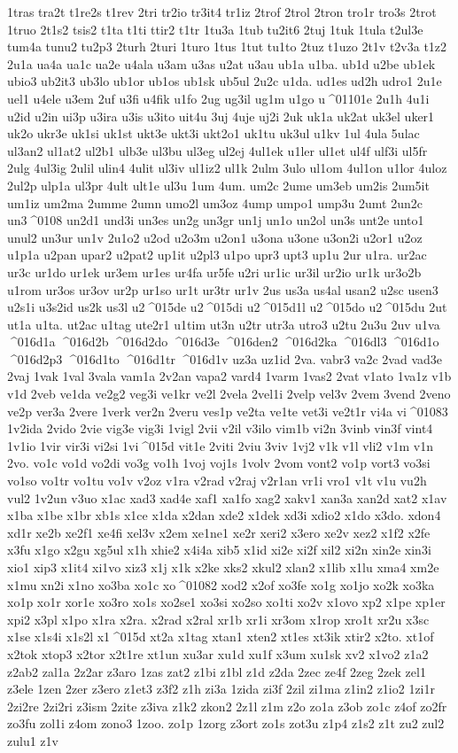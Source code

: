 {1tras
tra2t
t1re2s
t1rev
2tri
tr2io
tr3it4
tr1iz
2trof
2trol
2tron
tro1r
tro3s
2trot
1truo
2t1s2
tsis2
t1ta
t1ti
ttir2
t1tr
1tu3a
1tub
tu2it6
2tuj
1tuk
1tula
t2ul3e
tum4a
tunu2
tu2p3
2turh
2turi
1turo
1tus
1tut
tu1to
2tuz
t1uzo
2t1v
t2v3a
t1z2
2u1a
ua4a
ua1c
ua2e
u4ala
u3am
u3as
u2at
u3au
ub1a
u1ba.
ub1d
u2be
ub1ek
ubio3
ub2it3
ub3lo
ub1or
ub1os
ub1sk
ub5ul
2u2c
u1da.
ud1es
ud2h
udro1
2u1e
uel1
u4ele
u3em
2uf
u3fi
u4fik
u1fo
2ug
ug3il
ug1m
u1go
u^^^^01101e
2u1h
4u1i
u2id
u2in
ui3p
u3ira
u3is
u3ito
uit4u
3uj
4uje
uj2i
2uk
uk1a
uk2at
uk3el
uker1
uk2o
ukr3e
uk1si
uk1st
ukt3e
ukt3i
ukt2o1
uk1tu
uk3ul
u1kv
1ul
4ula
5ulac
ul3an2
ul1at2
ul2b1
ulb3e
ul3bu
ul3eg
ul2ej
4ul1ek
u1ler
ul1et
ul4f
ulf3i
ul5fr
2ulg
4ul3ig
2ulil
ulin4
4ulit
ul3iv
ul1iz2
ul1k
2ulm
3ulo
ul1om
4ul1on
u1lor
4uloz
2ul2p
ulp1a
ul3pr
4ult
ult1e
ul3u
1um
4um.
um2c
2ume
um3eb
um2is
2um5it
um1iz
um2ma
2umme
2umn
umo2l
um3oz
4ump
umpo1
ump3u
2umt
2un2c
un3^^^^0108
un2d1
und3i
un3es
un2g
un3gr
un1j
un1o
un2ol
un3s
unt2e
unto1
unul2
un3ur
un1v
2u1o2
u2od
u2o3m
u2on1
u3ona
u3one
u3on2i
u2or1
u2oz
u1p1a
u2pan
upar2
u2pat2
up1it
u2pl3
u1po
upr3
upt3
up1u
2ur
u1ra.
ur2ac
ur3c
ur1do
ur1ek
ur3em
ur1es
ur4fa
ur5fe
u2ri
ur1ic
ur3il
ur2io
ur1k
ur3o2b
u1rom
ur3os
ur3ov
ur2p
ur1so
ur1t
ur3tr
ur1v
2us
us3a
us4al
usan2
u2sc
usen3
u2s1i
u3s2id
us2k
us3l
u2^^^^015de
u2^^^^015di
u2^^^^015d1l
u2^^^^015do
u2^^^^015du
2ut
ut1a
u1ta.
ut2ac
u1tag
ute2r1
u1tim
ut3n
u2tr
utr3a
utro3
u2tu
2u3u
2uv
u1va
^^^^016d1a
^^^^016d2b
^^^^016d2do
^^^^016d3e
^^^^016den2
^^^^016d2ka
^^^^016dl3
^^^^016d1o
^^^^016d2p3
^^^^016d1to
^^^^016d1tr
^^^^016d1v
uz3a
uz1id
2va.
vabr3
va2c
2vad
vad3e
2vaj
1vak
1val
3vala
vam1a
2v2an
vapa2
vard4
1varm
1vas2
2vat
v1ato
1va1z
v1b
v1d
2veb
ve1da
ve2g2
veg3i
ve1kr
ve2l
2vela
2vel1i
2velp
vel3v
2vem
3vend
2veno
ve2p
ver3a
2vere
1verk
ver2n
2veru
ves1p
ve2ta
ve1te
vet3i
ve2t1r
vi4a
vi^^^^01083
1v2ida
2vido
2vie
vig3e
vig3i
1vigl
2vii
v2il
v3ilo
vim1b
vi2n
3vinb
vin3f
vint4
1v1io
1vir
vir3i
vi2si
1vi^^^^015d
vit1e
2viti
2viu
3viv
1vj2
v1k
v1l
vli2
v1m
v1n
2vo.
vo1c
vo1d
vo2di
vo3g
vo1h
1voj
voj1s
1volv
2vom
vont2
vo1p
vort3
vo3si
vo1so
vo1tr
vo1tu
vo1v
v2oz
v1ra
v2rad
v2raj
v2r1an
vr1i
vro1
v1t
v1u
vu2h
vul2
1v2un
v3uo
x1ac
xad3
xad4e
xaf1
xa1fo
xag2
xakv1
xan3a
xan2d
xat2
x1av
x1ba
x1be
x1br
xb1s
x1ce
x1da
x2dan
xde2
x1dek
xd3i
xdio2
x1do
x3do.
xdon4
xd1r
xe2b
xe2f1
xe4fi
xel3v
x2em
xe1ne1
xe2r
xeri2
x3ero
xe2v
xez2
x1f2
x2fe
x3fu
x1go
x2gu
xg5ul
x1h
xhie2
x4i4a
xib5
x1id
xi2e
xi2f
xil2
xi2n
xin2e
xin3i
xio1
xip3
x1it4
xi1vo
xiz3
x1j
x1k
x2ke
xks2
xkul2
xlan2
x1lib
x1lu
xma4
xm2e
x1mu
xn2i
x1no
xo3ba
xo1c
xo^^^^01082
xod2
x2of
xo3fe
xo1g
xo1jo
xo2k
xo3ka
xo1p
xo1r
xor1e
xo3ro
xo1s
xo2se1
xo3si
xo2so
xo1ti
xo2v
x1ovo
xp2
x1pe
xp1er
xpi2
x3pl
x1po
x1ra
x2ra.
x2rad
x2ral
xr1b
xr1i
xr3om
x1rop
xro1t
xr2u
x3sc
x1se
x1s4i
x1s2l
x1^^^^015d
xt2a
x1tag
xtan1
xten2
xt1es
xt3ik
xtir2
x2to.
xt1of
x2tok
xtop3
x2tor
x2t1re
xt1un
xu3ar
xu1d
xu1f
x3um
xu1sk
xv2
x1vo2
z1a2
z2ab2
zal1a
2z2ar
z3aro
1zas
zat2
z1bi
z1bl
z1d
z2da
2zec
ze4f
2zeg
2zek
zel1
z3ele
1zen
2zer
z3ero
z1et3
z3f2
z1h
zi3a
1zida
zi3f
2zil
zi1ma
z1in2
z1io2
1zi1r
2zi2re
2zi2ri
z3ism
2zite
z3iva
z1k2
zkon2
2z1l
z1m
z2o
zo1a
z3ob
zo1c
z4of
zo2fr
zo3fu
zol1i
z4om
zono3
1zoo.
zo1p
1zorg
z3ort
zo1s
zot3u
z1p4
z1s2
z1t
zu2
zul2
zulu1
z1v
}